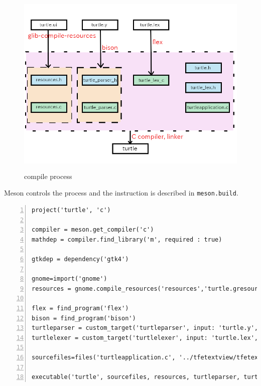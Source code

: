 \begin{figure}
\centering
\includegraphics[width=12cm,height=9cm]{../image/turtle_compile_process.png}
\caption{compile process}
\end{figure}

Meson controls the process and the instruction is described in
\passthrough{\lstinline!meson.build!}.

\begin{lstlisting}[numbers=left]
project('turtle', 'c')

compiler = meson.get_compiler('c')
mathdep = compiler.find_library('m', required : true)

gtkdep = dependency('gtk4')

gnome=import('gnome')
resources = gnome.compile_resources('resources','turtle.gresource.xml')

flex = find_program('flex')
bison = find_program('bison')
turtleparser = custom_target('turtleparser', input: 'turtle.y', output: ['turtle_parser.c', 'turtle_parser.h'], command: [bison, '-d', '-o', 'turtle_parser.c', '@INPUT@'])
turtlelexer = custom_target('turtlelexer', input: 'turtle.lex', output: 'turtle_lex.c', command: [flex, '-o', '@OUTPUT@', '@INPUT@'])

sourcefiles=files('turtleapplication.c', '../tfetextview/tfetextview.c')

executable('turtle', sourcefiles, resources, turtleparser, turtlelexer, turtleparser[1], dependencies: [mathdep, gtkdep], export_dynamic: true, install: true)
\end{lstlisting}

